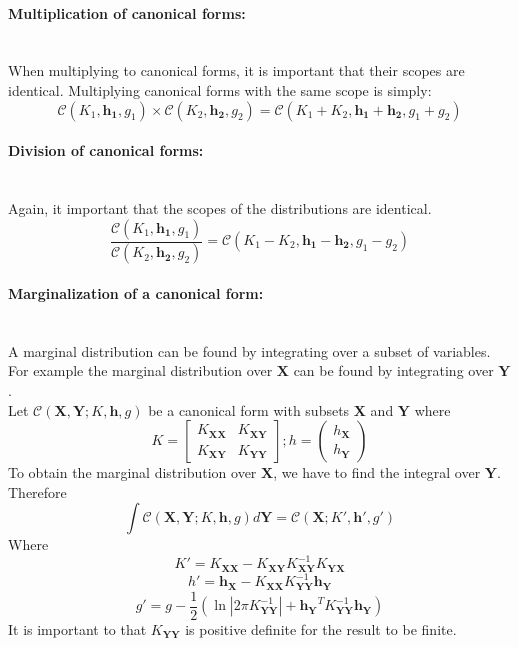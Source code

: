 \documentclass[12pt,oneside,openany,a4paper, %
afrikaans,english,
]{memoir}
\numberwithin{equation}{chapter}
\begin{document}
\paragraph{Multiplication of canonical forms:}\mbox{}
\\When multiplying to canonical forms, it is important that their scopes are identical. Multiplying canonical forms with the same scope is simply:
\begin{equation}\label{eq:10}
\mathcal{C}(K_1,\bm{h_1},g_1)\times\mathcal{C}(K_2,\bm{h_2},g_2) = \mathcal{C}(K_1 + K_2,\bm{h_1} + \bm{h_2},g_1 + g_2)
\end{equation}
\paragraph{Division of canonical forms:}\mbox{}\\
Again, it important that the scopes of the distributions are identical.
\begin{equation}\label{eq:11}
\frac{\mathcal{C}(K_1,\bm{h_1},g_1)}{\mathcal{C}(K_2,\bm{h_2},g_2)} = \mathcal{C}(K_1 - K_2,\bm{h_1} - \bm{h_2},g_1 - g_2)
\end{equation}
\paragraph{Marginalization of a canonical form:}\mbox{}\\
A marginal distribution can be found by integrating over a subset of variables. For example the marginal distribution over $\bm{X}$ can be found by integrating over $\bm{Y}$.\\
Let $\mathcal{C}(\bm{X},\bm{Y};K,\bm{h},g)$ be a canonical form with subsets $\bm{X}$ and $\bm{Y}$ where
\begin{equation}
K = 
\begin{bmatrix}
K_{\bm{XX}} & K_{\bm{XY}}\\
K_{\bm{XY}} & K_{\bm{YY}}
\end{bmatrix}
 ; h = 
\begin{pmatrix}
h_{\bm{X}} \\
h_{\bm{Y}}
\end{pmatrix}
\end{equation}
To obtain the marginal distribution over $\bm{X}$, we have to find the integral over $\bm{Y}$. Therefore
\begin{equation}
\int\mathcal{C}(\bm{X},\bm{Y};K,\bm{h},g)d\bm{Y} = \mathcal{C}(\bm{X};K',\bm{h}',g')
\end{equation}
 Where
\begin{equation}
K' = K_{\bm{XX}} - K_{\bm{XY}}K_{\bm{XY}}^{-1}K_{\bm{YX}}
\end{equation}
\begin{equation}
h' = \bm{h}_{\bm{X}} - K_{\bm{XX}}K_{\bm{YY}}^{-1}\bm{h}_{\bm{Y}}
\end{equation}
\begin{equation}
g' = g - \frac{1}{2}\left(\ln|2\pi K_{\bm{YY}}^{-1}|+ \bm{h_Y}^T K_{\bm{YY}}^{-1}\bm{h_Y}\right)
\end{equation}
It is important to that $K_{\bm{YY}}$ is positive definite for the result to be finite.
\end{document}
